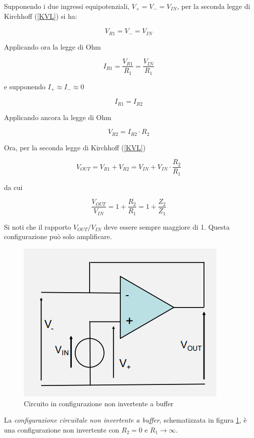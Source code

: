 \documentclass{article}
\begin{document}
Supponendo i due ingressi equipotenziali, $V_+ = V_- = V_{IN}$, per la seconda legge di Kirchhoff (\ref{KVL}) si ha:

\[V_{R1} = V_- = V_{IN}\]

Applicando ora la legge di Ohm

\[I_{R1} = \frac{V_{R1}}{R_1} = \frac{V_{IN}}{R_1}\]

e supponendo $I_{+} \approx I_{-} \approx 0$

\[I_{R1} = I_{R2}\]

Applicando ancora la legge di Ohm

\[V_{R2} = I_{R2} \cdot R_2\]

Ora, per la seconda legge di Kirchhoff (\ref{KVL})

\[V_{OUT} = V_{R1} + V_{R2} = V_{IN} + V_{IN} \cdot \frac{R_2}{R_1}\]

da cui 

\[\frac{V_{OUT}}{V_{IN}} = 1 + \frac{R_2}{R_1} = 1 + \frac{Z_2}{Z_1}\]

Si noti che il rapporto $V_{OUT}/V_{IN}$ deve essere sempre maggiore di 1. Questa configurazione può solo amplificare.

\clearpage
\begin{figure}[h]
  \centering
  \includegraphics[scale=0.7]{IM_circuito_non_invertente_buffer}
  \caption{Circuito in configurazione non invertente a buffer}
  \label{Schema_circuito_non_invertente_buffer}
\end{figure}

La \textit{configurazione circuitale non invertente a buffer}, schematizzata in figura \ref{Schema_circuito_non_invertente_buffer}, è una configurazione non invertente con $R_2 = 0$ e $R_1 \rightarrow \infty$.
\end{document}
